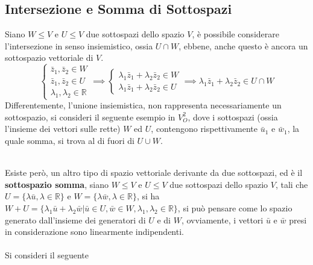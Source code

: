 \documentclass[12pt, letterpaper]{article}
\newcommand{\R}{{\mathbb R}}
\newcommand{\acc}{\\\hphantom{}\\}
\begin{document}
\subsection{Intersezione e Somma di Sottospazi}
Siano \(W\le V\) e \(U\le V\) due sottospazi dello spazio \(V\), è possibile considerare l'intersezione 
in senso insiemistico, ossia \(U\cap W\), ebbene, anche questo è ancora un sottospazio vettoriale 
di \(V\).\begin{equation}
    \begin{cases}
        \bar z_1,\bar z_2 \in W\\
        \bar z_1,\bar z_2 \in U\\
        \lambda_1,\lambda_2 \in \R 
    \end{cases}\implies\begin{cases}
        \lambda_1\bar z_1+\lambda_2\bar z_2 \in W\\
        \lambda_1\bar z_1+\lambda_2\bar z_2  \in U
    \end{cases}\implies \lambda_1\bar z_1+\lambda_2\bar z_2  \in U\cap W
\end{equation}\newpage
Differentemente, l'unione insiemistica, non rappresenta necessariamente un sottospazio, si consideri il 
seguente esempio in \(V_O^2\), dove i sottospazi (ossia l'insieme dei vettori sulle rette) \(W\) ed \(U\), 
contengono rispettivamente \(\bar u_1\) e \(\bar w_1\), la quale somma, si trova al di fuori di \(U\cup W\). 
\begin{figure}[h]
    \end{figure}\\ 
Esiste però, un altro tipo di spazio vettoriale derivante da due sottospazi, ed è il 
\textbf{sottospazio somma}, siano  \(W\le V\) e \(U\le V\) due sottospazi dello spazio \(V\), 
tali che \(U=\{\lambda\bar u, \lambda \in \R\}\) e \(W=\{\lambda\bar w, \lambda \in \R\}\),
si ha \(W+U=\{\lambda_1\bar u + \lambda_2\bar w | \bar u \in U, \bar w \in W,\lambda_1,\lambda_2 \in \R\}\), 
si può pensare come lo spazio generato dall'insieme dei generatori di \(U\) e di \(W\), ovviamente, i vettori 
\(\bar u\) e \(\bar w\) presi in considerazione sono linearmente indipendenti.\acc Si consideri il seguente 
\end{document}
